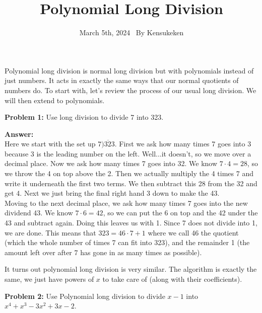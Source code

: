 \documentclass[letterpaper,11pt]{amsart}
\title{Polynomial Long Division}
\date{March 5th, 2024 $\,$  By Kensukeken}
\theoremstyle{plain}
\theoremstyle{definition}
\theoremstyle{remark}
\newcommand{\<}{\langle}
\renewcommand{\>}{\rangle}
\begin{document}
\maketitle

Polynomial long division is normal long division but with polynomials instead of just numbers.  It acts in exactly the same ways that our normal quotients of numbers do.  To start with, let's review the process of our usual long division.  We will then extend to polynomials.


\medskip

\textbf{Problem 1:}  Use long division to divide 7 into 323.  

\textbf{Answer:} \\

Here we start with the set up $7 \overline{)323}$.  First we ask how many times 7 goes into 3 because 3 is the leading number on the left.  Well...it doesn't, so we move over a decimal place.  Now we ask how many times 7 goes into 32.  We know $7 \cdot 4= 28$, so we throw the 4 on top above the 2.  Then we actually multiply the 4 times 7 and write it underneath the first two terms.  We then subtract this 28 from the 32 and get 4.  Next we just bring the final right hand 3 down to make the 43.  \\

Moving to the next decimal place, we ask how many times 7 goes into the new dividend 43.  We know $7 \cdot 6 =42$, so we can put the 6 on top and the 42 under the 43 and subtract again.  Doing this leaves us with 1.  Since 7 does not divide into 1, we are done.  This means that $323 = 46 \cdot 7 + 1$ where we call 46 the quotient (which the whole number of times 7 can fit into 323), and the remainder 1 (the amount left over after 7 has gone in as many times as possible).


It turns out polynomial long division is very similar.  The algorithm is exactly the same, we just have powers of $x$ to take care of (along with their coefficients).

\textbf{Problem 2:}  Use Polynomial long division to divide $x-1$ into\\ $x^4+x^3-3x^2+3x-2$.
\end{document}
